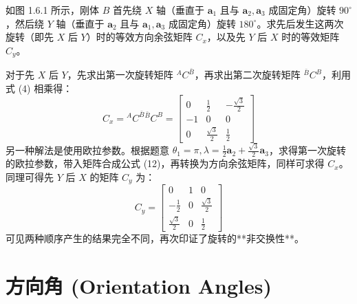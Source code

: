 \begin{example}[陀螺仪支架的连续旋转]
    如图 1.6.1 所示，刚体 \(B\) 首先绕 \(X\) 轴（垂直于 \(\mathbf{a}_1\) 且与 \(\mathbf{a}_2,\mathbf{a}_3\) 成固定角）旋转 \(90^\circ\)，然后绕 \(Y\) 轴（垂直于 \(\mathbf{a}_2\) 且与 \(\mathbf{a}_1,\mathbf{a}_3\) 成固定角）旋转 \(180^\circ\)。求先后发生这两次旋转（即先 \(X\) 后 \(Y\)）时的等效方向余弦矩阵 \(C_x\)，以及先 \(Y\) 后 \(X\) 时的等效矩阵 \(C_y\)。
    \begin{solution}
    对于先 \(X\) 后 \(Y\)，先求出第一次旋转矩阵 \({}^A C^{\bar{B}}\)，再求出第二次旋转矩阵 \({}^{\bar{B}} C^B\)，利用式 (4) 相乘得：
    \begin{equation}
        C_x = {}^A C^{\bar{B}} {}^{\bar{B}} C^B = \begin{bmatrix} 0 & \frac{1}{2} & -\frac{\sqrt{3}}{2} \\ -1 & 0 & 0 \\ 0 & \frac{\sqrt{3}}{2} & \frac{1}{2} \end{bmatrix} \tag{41}
    \end{equation}
    另一种解法是使用欧拉参数。根据题意 \(\theta_1=\pi, \lambda=\frac{1}{2}\mathbf{a}_2+\frac{\sqrt{3}}{2}\mathbf{a}_3\)，求得第一次旋转的欧拉参数，带入矩阵合成公式 (12)，再转换为方向余弦矩阵，同样可求得 \(C_x\)。
    同理可得先 \(Y\) 后 \(X\) 的矩阵 \(C_y\) 为：
    \begin{equation}
        C_y = \begin{bmatrix} 0 & 1 & 0 \\ -\frac{1}{2} & 0 & \frac{\sqrt{3}}{2} \\ \frac{\sqrt{3}}{2} & 0 & \frac{1}{2} \end{bmatrix} \tag{49}
    \end{equation}
    可见两种顺序产生的结果完全不同，再次印证了旋转的**非交换性**。
    \end{solution}
\end{example}

\vspace{1em}
\section{方向角 (Orientation Angles)}


